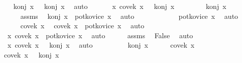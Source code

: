 \begin{isabellebody}
\begin{exercise}[subtitle=Isar dokazi u logici prvog reda.]
\ \ \isamarkupfalse%
\ {\isachardoublequoteopen}konj\ x\ {\isasymor}\ {\isasymnot}\ konj\ x{\isachardoublequoteclose}\ \isamarkupfalse%
\ auto\isanewline
\ \ \isamarkupfalse%
\ \isamarkupfalse%
\ {\isachardoublequoteopen}{\isasymexists}\ x{\isachardot}{\kern0pt}\ covek\ x\ {\isasymand}\ {\isasymnot}\ konj\ x{\isachardoublequoteclose}\isanewline
\ \ \isamarkupfalse%
\isanewline
\ \ \ \ \isamarkupfalse%
\ {\isachardoublequoteopen}konj\ x{\isachardoublequoteclose}\isanewline
\ \ \ \ \isamarkupfalse%
\isanewline
\ \ \ \ \isamarkupfalse%
\ assms{\isacharparenleft}{\kern0pt}{}{\isacharparenright}{\kern0pt}\ \isamarkupfalse%
\ {\isachardoublequoteopen}konj\ x\ {\isasymlongrightarrow}\ potkovice\ x{\isachardoublequoteclose}\ \isamarkupfalse%
\ auto\isanewline
\ \ \ \ \isamarkupfalse%
\ \isanewline
\ \ \ \ \isamarkupfalse%
\ {\isachardoublequoteopen}potkovice\ x{\isachardoublequoteclose}\ \isamarkupfalse%
\ auto\isanewline
\ \ \ \ \isamarkupfalse%
\ {\isacartoucheopen}covek\ x{\isacartoucheclose}\ \isamarkupfalse%
\ {\isachardoublequoteopen}covek\ x\ {\isasymand}\ potkovice\ x{\isachardoublequoteclose}\ \isamarkupfalse%
\ auto\isanewline
\ \ \ \ \isamarkupfalse%
\ \isamarkupfalse%
\ {\isachardoublequoteopen}{\isasymexists}\ x{\isachardot}{\kern0pt}\ covek\ x\ {\isasymand}\ potkovice\ x{\isachardoublequoteclose}\ \isamarkupfalse%
\ auto\isanewline
\ \ \ \ \isamarkupfalse%
\ assms{\isacharparenleft}{\kern0pt}{}{\isacharparenright}{\kern0pt}\ \isamarkupfalse%
\ False\ \isamarkupfalse%
\ auto\isanewline
\ \ \ \ \isamarkupfalse%
\ \isamarkupfalse%
\ {\isachardoublequoteopen}{\isasymexists}\ x{\isachardot}{\kern0pt}\ covek\ x\ {\isasymand}\ {\isasymnot}\ konj\ x{\isachardoublequoteclose}\ \isamarkupfalse%
\ auto\isanewline
\ \ \isamarkupfalse%
\isanewline
\ \ \ \ \isamarkupfalse%
\ {\isachardoublequoteopen}{\isasymnot}\ konj\ x{\isachardoublequoteclose}\isanewline
\ \ \ \ \isamarkupfalse%
\ {\isacartoucheopen}covek\ x{\isacartoucheclose}\ \isamarkupfalse%
\ {\isachardoublequoteopen}covek\ x\ {\isasymand}\ {\isasymnot}\ konj\ x{\isachardoublequoteclose}\ \isamarkupfalse%

\end{exercise}
\end{isabellebody}
